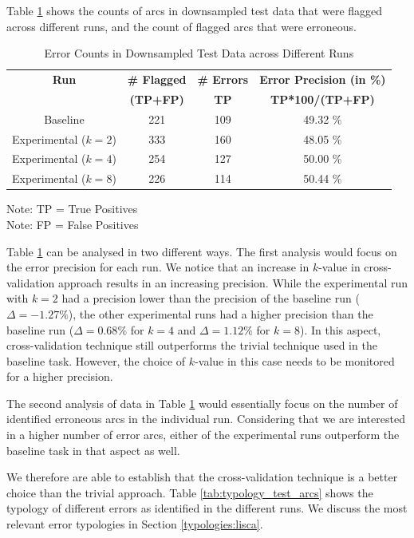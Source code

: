 Table \ref{tab:baseline_cv_error_percentage} shows the counts of arcs in downsampled test data that were flagged across different runs, and the count of flagged arcs that were erroneous.

\begin{table}[H]
    \centering
    \begin{tabular}{|c|c|c|c|}
    \hline
    \textbf{Run} & \textbf{\# Flagged} & \textbf{\# Errors} & \textbf{Error Precision (in \%)}\\
    \textbf{ } & \textbf{(TP+FP)} & \textbf{TP} & \textbf{TP*100/(TP+FP)}\\
    \hline
    Baseline & 221 & 109 & 49.32 \%\\
    Experimental ($k=2$) & 333 & 160 & 48.05 \%\\
    Experimental ($k=4$) & 254 & 127 & 50.00 \%\\
    Experimental ($k=8$) & 226 & 114 & 50.44 \%\\
    \hline
    \end{tabular}
    \caption{Error Counts in Downsampled Test Data across Different Runs}
    Note: TP = True Positives\\
    Note: FP = False Positives
    \label{tab:baseline_cv_error_percentage}
\end{table}

Table \ref{tab:baseline_cv_error_percentage} can be analysed in two different ways. The first analysis would focus on the error precision for each run. We notice that an increase in $k$-value in cross-validation approach results in an increasing precision. While the experimental run with $k=2$ had a precision lower than the precision of the baseline run ($\Delta = -1.27 \%$), the other experimental runs had a higher precision than the baseline run ($\Delta = 0.68 \%$ for $k=4$ and $\Delta = 1.12 \%$ for $k=8$). In this aspect, cross-validation technique still outperforms the trivial technique used in the baseline task. However, the choice of $k$-value in this case needs to be monitored for a higher precision.

The second analysis of data in Table \ref{tab:baseline_cv_error_percentage} would essentially focus on the number of identified erroneous arcs in the individual run. Considering that we are interested in a higher number of error arcs, either of the experimental runs outperform the baseline task in that aspect as well.

We therefore are able to establish that the cross-validation technique is a better choice than the trivial approach. Table \ref{tab:typology_test_arcs} shows the typology of different errors as identified in the different runs. We discuss the most relevant error typologies in Section \ref{typologies:lisca}.

